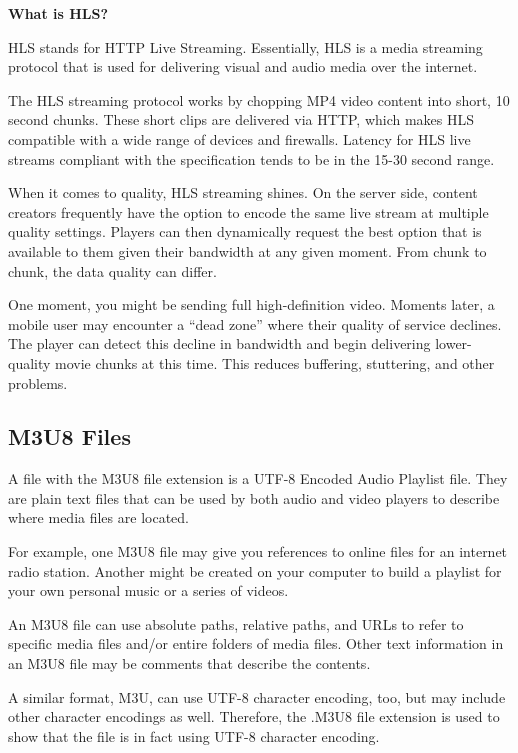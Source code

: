 \documentclass{article}
\begin{document}
			\bigskip
			\textbf{What is HLS?}

			HLS stands for HTTP Live Streaming. Essentially, HLS is a media streaming protocol that is used for delivering visual and audio media over the internet.

			The HLS streaming protocol works by chopping MP4 video content into short, 10 second chunks. These short clips are delivered via HTTP, which makes HLS compatible with a wide range of devices and firewalls. Latency for HLS live streams compliant with the specification tends to be in the 15-30 second range.

			When it comes to quality, HLS streaming shines. On the server side, content creators frequently have the option to encode the same live stream at multiple quality settings. Players can then dynamically request the best option that is available to them given their bandwidth at any given moment. From chunk to chunk, the data quality can differ.

			One moment, you might be sending full high-definition video. Moments later, a mobile user may encounter a “dead zone” where their quality of service declines. The player can detect this decline in bandwidth and begin delivering lower-quality movie chunks at this time. This reduces buffering, stuttering, and other problems.

		\subsection{M3U8 Files}
			A file with the M3U8 file extension is a UTF-8 Encoded Audio Playlist file. They are plain text files that can be used by both audio and video players to describe where media files are located.

			For example, one M3U8 file may give you references to online files for an internet radio station. Another might be created on your computer to build a playlist for your own personal music or a series of videos.

			An M3U8 file can use absolute paths, relative paths, and URLs to refer to specific media files and/or entire folders of media files. Other text information in an M3U8 file may be comments that describe the contents.

			A similar format, M3U, can use UTF-8 character encoding, too, but may include other character encodings as well. Therefore, the .M3U8 file extension is used to show that the file is in fact using UTF-8 character encoding.
\end{document}
